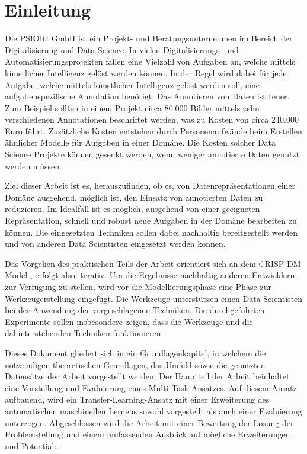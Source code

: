 \listoftodos

\chapter{Einleitung}
\label{chap:Einleitung}
	Die PSIORI GmbH \cite{PSIORIGmbH.2020} ist ein Projekt- und Beratungsunternehmen im Bereich der Digitalisierung und Data Science. In vielen Digitalisierungs- und Automatisierungsprojekten fallen eine Vielzahl von Aufgaben an, welche mittels künstlicher Intelligenz gelöst werden können. In der Regel wird dabei für jede Aufgabe, welche mittels künstlicher Intelligenz gelöst werden soll, eine aufgabenspezifische Annotation benötigt. Das Annotieren von Daten ist teuer. Zum Beispiel sollten in einem Projekt circa 80.000 Bilder mittels zehn verschiedenen Annotationen beschriftet werden, was zu Kosten von circa 240.000 Euro führt. Zusätzliche Kosten entstehen durch Personenaufwände beim Erstellen ähnlicher Modelle für Aufgaben in einer Domäne. Die Kosten solcher Data Science Projekte können gesenkt werden, wenn weniger annotierte Daten genutzt werden müssen.
	
	Ziel dieser Arbeit ist es, herauszufinden, ob es, von Datenrepräsentationen einer Domäne ausgehend, möglich ist, den Einsatz von annotierten Daten zu reduzieren. Im Idealfall ist es möglich, ausgehend von einer geeigneten Repräsentation, schnell und robust neue Aufgaben in der Domäne bearbeiten zu können. Die eingesetzten Techniken sollen dabei nachhaltig bereitgestellt werden und von anderen Data Scientisten eingesetzt werden können. 
	
	Das Vorgehen des praktischen Teils der Arbeit orientiert sich an dem CRISP-DM Model \cite{Shearer.2000}, erfolgt also iterativ. Um die Ergebnisse nachhaltig anderen Entwicklern zur Verfügung zu stellen, wird vor die Modellierungsphase eine Phase zur Werkzeugerstellung eingefügt. Die Werkzeuge unterstützen einen Data Scientisten bei der Anwendung der vorgeschlagenen Techniken. Die durchgeführten Experimente sollen insbesondere zeigen, dass die Werkzeuge und die dahinterstehenden Techniken funktionieren. 
	
	Dieses Dokument gliedert sich in ein Grundlagenkapitel, in welchem die notwendigen theoretischen Grundlagen, das Umfeld sowie die genutzten Datensätze der Arbeit vorgestellt werden. Der Hauptteil der Arbeit beinhaltet eine  Vorstellung und Evaluierung eines Multi-Task-Ansatzes. Auf diesem Ansatz aufbauend, wird ein Transfer-Learning-Ansatz mit einer Erweiterung des automatischen maschinellen Lernens sowohl vorgestellt als auch einer Evaluierung unterzogen. Abgeschlossen wird die Arbeit mit einer Bewertung der Lösung der Problemstellung und einem umfassenden Ausblick auf mögliche Erweiterungen und Potentiale.

